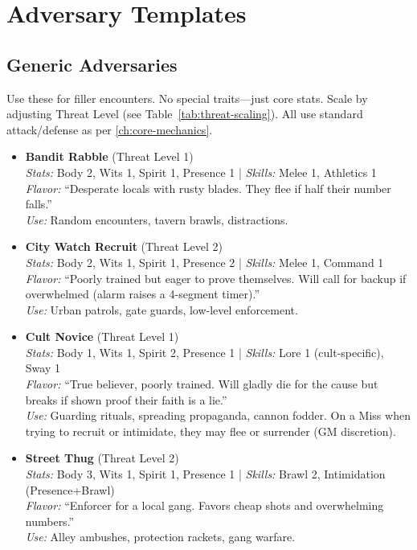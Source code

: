 \section{Adversary Templates}

\subsection{Generic Adversaries}
\label{subsec:generic-adversaries}
Use these for filler encounters. No special traits---just core stats. Scale by adjusting Threat Level (see Table~\ref{tab:threat-scaling}). All use standard attack/defense as per \autoref{ch:core-mechanics}.

\begin{itemize}
    \item \textbf{Bandit Rabble} (Threat Level 1) \\
    \textit{Stats:} Body 2, Wits 1, Spirit 1, Presence 1 \quad | \quad \textit{Skills:} Melee 1, Athletics 1 \\
    \textit{Flavor:} ``Desperate locals with rusty blades. They flee if half their number falls.'' \\
    \textit{Use:} Random encounters, tavern brawls, distractions.

    \item \textbf{City Watch Recruit} (Threat Level 2) \\
    \textit{Stats:} Body 2, Wits 1, Spirit 1, Presence 2 \quad | \quad \textit{Skills:} Melee 1, Command 1 \\
    \textit{Flavor:} ``Poorly trained but eager to prove themselves. Will call for backup if overwhelmed (alarm raises a 4-segment timer).'' \\
    \textit{Use:} Urban patrols, gate guards, low-level enforcement.

    \item \textbf{Cult Novice} (Threat Level 1) \\
    \textit{Stats:} Body 1, Wits 1, Spirit 2, Presence 1 \quad | \quad \textit{Skills:} Lore 1 (cult-specific), Sway 1 \\
    \textit{Flavor:} ``True believer, poorly trained. Will gladly die for the cause but breaks if shown proof their faith is a lie.'' \\
    \textit{Use:} Guarding rituals, spreading propaganda, cannon fodder. On a Miss when trying to recruit or intimidate, they may flee or surrender (GM discretion).

    \item \textbf{Street Thug} (Threat Level 2) \\
    \textit{Stats:} Body 3, Wits 1, Spirit 1, Presence 1 \quad | \quad \textit{Skills:} Brawl 2, Intimidation (Presence+Brawl) \\
    \textit{Flavor:} ``Enforcer for a local gang. Favors cheap shots and overwhelming numbers.'' \\
    \textit{Use:} Alley ambushes, protection rackets, gang warfare.


\end{itemize}
